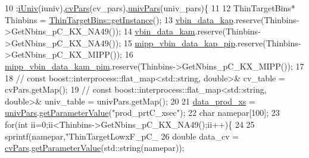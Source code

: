 \begin{DoxyCode}
10                                                                                                            
                            :\hyperlink{class_neutrino_flux_reweight_1_1_thin_targetp_c_kaon_reweighter_a3ff9d5c19007a8272c69e15cc3c7742b}{iUniv}(iuniv),\hyperlink{class_neutrino_flux_reweight_1_1_thin_targetp_c_kaon_reweighter_a474281c2bfbea82f8ddfad0cab1f1146}{cvPars}(cv\_pars),\hyperlink{class_neutrino_flux_reweight_1_1_thin_targetp_c_kaon_reweighter_a09bb649b2bc0b55691bcd9bc1228536b}{univPars}(univ\_pars)\{
11   
12     ThinTargetBins* Thinbins =  \hyperlink{class_neutrino_flux_reweight_1_1_thin_target_bins_aeff5cf7220dd08322f5abac2cbc7ff33}{ThinTargetBins::getInstance}();
13     \hyperlink{class_neutrino_flux_reweight_1_1_thin_targetp_c_kaon_reweighter_a7e9b49e61de648fbe1198c3ae68ce15f}{vbin\_data\_kap}.reserve(Thinbins->GetNbins\_pC\_KX\_NA49());
14     \hyperlink{class_neutrino_flux_reweight_1_1_thin_targetp_c_kaon_reweighter_afdc746047f72743b45affc7f51f8ba3f}{vbin\_data\_kam}.reserve(Thinbins->GetNbins\_pC\_KX\_NA49());
15     \hyperlink{class_neutrino_flux_reweight_1_1_thin_targetp_c_kaon_reweighter_a6ad9b6cccb6fc522708b1aa5b9070c71}{mipp\_vbin\_data\_kap\_pip}.reserve(Thinbins->GetNbins\_pC\_KX\_MIPP());
16     \hyperlink{class_neutrino_flux_reweight_1_1_thin_targetp_c_kaon_reweighter_ab268b6554b6abe96854cec82f336816d}{mipp\_vbin\_data\_kam\_pim}.reserve(Thinbins->GetNbins\_pC\_KX\_MIPP());
17 
18     \textcolor{comment}{// const boost::interprocess::flat\_map<std::string, double>& cv\_table   = cvPars.getMap();}
19     \textcolor{comment}{// const boost::interprocess::flat\_map<std::string, double>& univ\_table = univPars.getMap();}
20        
21     \hyperlink{class_neutrino_flux_reweight_1_1_thin_targetp_c_kaon_reweighter_ae26e9fbd1c42a53759a1587a3312a4fb}{data\_prod\_xs} = \hyperlink{class_neutrino_flux_reweight_1_1_thin_targetp_c_kaon_reweighter_a09bb649b2bc0b55691bcd9bc1228536b}{univPars}.\hyperlink{class_neutrino_flux_reweight_1_1_parameter_table_acb7dc8335b65b116f6092f2fa57ca5ed}{getParameterValue}(\textcolor{stringliteral}{"prod\_prtC\_xsec"});
22     \textcolor{keywordtype}{char} namepar[100];
23     \textcolor{keywordflow}{for}(\textcolor{keywordtype}{int} ii=0;ii<Thinbins->GetNbins\_pC\_KX\_NA49();ii++)\{
24       
25       sprintf(namepar,\textcolor{stringliteral}{"ThinTargetLowxF\_pC\_%
26       \textcolor{keywordtype}{double} data\_cv  = \hyperlink{class_neutrino_flux_reweight_1_1_thin_targetp_c_kaon_reweighter_a474281c2bfbea82f8ddfad0cab1f1146}{cvPars}.\hyperlink{class_neutrino_flux_reweight_1_1_parameter_table_acb7dc8335b65b116f6092f2fa57ca5ed}{getParameterValue}(std::string(namepar));
}
\end{DoxyCode}
